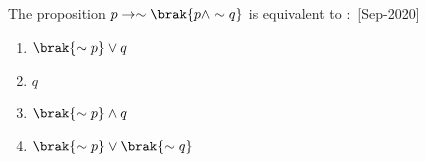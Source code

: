     \item The proposition $p \rightarrow \sim \brak{p\wedge \sim q}$ is equivalent to $\colon$
    \hfill{[Sep-2020]}
        \begin{enumerate}
            \item $\brak{\sim p}\vee q$
            \item $q$
            \item $\brak{\sim p}\wedge q$
            \item $\brak{\sim p}\vee \brak{\sim q}$
        \end{enumerate}
